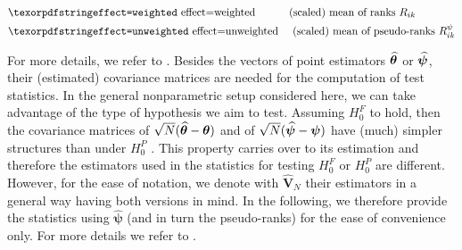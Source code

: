 \begin{align*}
&\text{\code{effect=weighted}}   & & \text{(scaled) mean of ranks} \ R_{ik} \\
&\text{\code{effect=unweighted}}   & &\text{ (scaled) mean of pseudo-ranks} \ 
R_{ik}^\psi 
\end{align*}

For more details, we refer to \cite[Section 2.3.2]{brunner2019rank}. Besides 
the vectors of point estimators $\boldsymbol{\widehat{\theta}}$ or $\boldsymbol{\widehat{\psi}}$, their (estimated) 
covariance matrices are needed for the computation of test statistics.
In the general nonparametric setup considered here, we can take advantage of 
the type of hypothesis we aim to test. Assuming $H_0^F$ to hold, then the 
covariance matrices of $\sqrt{N}(\boldsymbol{\widehat{\theta}} - \boldsymbol{\theta})$ and  of $\sqrt{N}(
\boldsymbol{\widehat{\psi}} - \boldsymbol{\psi})$ have (much) simpler structures than under $H_0^P$ 
\citep{konietschke2012rank}. 
This property carries over to its estimation and therefore the estimators used 
in the statistics for testing $H_0^F$ or $H_0^P$ are different. However, for 
the ease of notation, we denote with $\widehat{\mathbf{V}}_N$ their estimators 
in a general way having both versions in mind. In the following, we therefore 
provide the statistics using $\widehat{\bm{\psi}}$ (and in turn the 
pseudo-ranks) for the ease of convenience only. For more details we refer to 
\cite{brunner2020ranks}.


